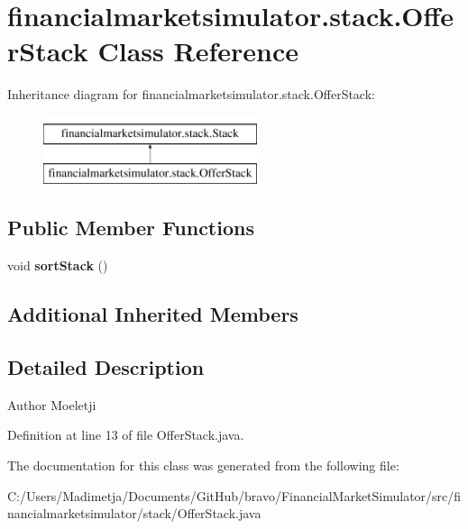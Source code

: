 \hypertarget{classfinancialmarketsimulator_1_1stack_1_1_offer_stack}{\section{financialmarketsimulator.\+stack.\+Offer\+Stack Class Reference}
\label{classfinancialmarketsimulator_1_1stack_1_1_offer_stack}
}
Inheritance diagram for financialmarketsimulator.\+stack.\+Offer\+Stack\+:\begin{figure}[H]
\begin{center}
\leavevmode
\includegraphics[height=2.000000cm]{classfinancialmarketsimulator_1_1stack_1_1_offer_stack}
\end{center}
\end{figure}
\subsection*{Public Member Functions}
\begin{DoxyCompactItemize}
\item 
\hypertarget{classfinancialmarketsimulator_1_1stack_1_1_offer_stack_a34bc18d02e364310b528b9a40f58d16f}{void {\bfseries sort\+Stack} ()}\label{classfinancialmarketsimulator_1_1stack_1_1_offer_stack_a34bc18d02e364310b528b9a40f58d16f}

\end{DoxyCompactItemize}
\subsection*{Additional Inherited Members}


\subsection{Detailed Description}
\begin{DoxyAuthor}{Author}
Moeletji 
\end{DoxyAuthor}


Definition at line 13 of file Offer\+Stack.\+java.



The documentation for this class was generated from the following file\+:\begin{DoxyCompactItemize}
\item 
C\+:/\+Users/\+Madimetja/\+Documents/\+Git\+Hub/bravo/\+Financial\+Market\+Simulator/src/financialmarketsimulator/stack/Offer\+Stack.\+java\end{DoxyCompactItemize}
